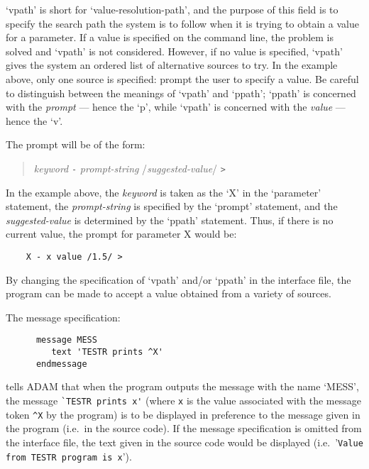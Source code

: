 `vpath' is short for `value-resolution-path', and the purpose of this field is
to specify the search path the system is to follow when it is trying to obtain
a value for a parameter.
If a value is specified on the command line, the problem is solved and `vpath'
is not considered.
However, if no value is specified, `vpath' gives the system an ordered list of
alternative sources to try.
In the example above, only one source is specified: prompt the user to specify
a value.
Be careful to distinguish between the meanings of `vpath' and `ppath';
`ppath' is concerned with the {\em prompt} --- hence the `p', while `vpath' is
concerned with the {\em value} --- hence the `v'.

The prompt will be of the form:
\begin{quote}
{\em keyword}\/ \verb/-/ {\em prompt-string} /{\em suggested-value}/ \verb/>/
\end{quote}
In the example above, the {\em keyword} is taken as the `X' in the `parameter'
statement, the {\em prompt-string} is specified by the `prompt' statement, and
the {\em suggested-value} is determined by the `ppath' statement.
Thus, if there is no current value, the prompt for parameter X would be:

\begin{small}
\begin{verbatim}
    X - x value /1.5/ >
\end{verbatim}
\end{small}

By changing the specification of `vpath' and/or `ppath' in the interface file,
the program can be made to accept a value obtained from a variety of sources.

The message specification:

\begin{small}
\begin{verbatim}
      message MESS
         text 'TESTR prints ^X'
      endmessage
\end{verbatim}
\end{small}

tells ADAM that when the program outputs the message with the name `MESS',
the message \verb+`TESTR prints x'+ (where \verb+x+ is the value associated
with the message token \verb+^X+ by the program) is to be displayed in
preference to the message given in the program (i.e.\ in the source code).
If the message specification is omitted from the interface file, the text given
in the source code would be displayed 
(i.e.\ '\verb+Value from TESTR program is x+').

